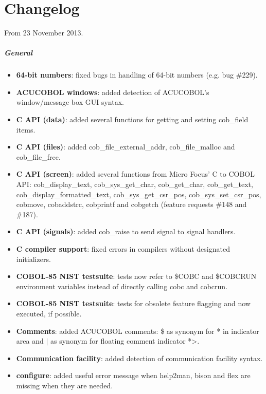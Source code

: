 \chapter{Changelog}

From 23 November 2013.


\paragraph{General}
\begin{itemize}
\item \textbf{64-bit numbers}: fixed bugs in handling of 64-bit numbers (e.g. bug \#229).
\item \textbf{ACUCOBOL windows}: added detection of ACUCOBOL's window\slash{}message box GUI syntax.
\item \textbf{C API (data)}: added several functions for getting and setting cob\_field items.
\item \textbf{C API (files)}: added cob\_file\_external\_addr, cob\_file\_malloc and cob\_file\_free.
\item \textbf{C API (screen)}: added several functions from Micro Focus' C to COBOL API: cob\_display\_text, cob\_sys\_get\_char, cob\_get\_char, cob\_get\_text, cob\_display\_formatted\_text, cob\_sys\_get\_csr\_pos, cob\_sys\_set\_csr\_pos, cobmove, cobaddstrc, cobprintf and cobgetch (feature requests \#148 and \#187).
\item \textbf{C API (signals)}: added cob\_raise to send signal to signal handlers.
\item \textbf{C compiler support}: fixed errors in compilers without designated initializers.
\item \textbf{COBOL-85 NIST testsuite}: tests now refer to \$COBC and \$COBCRUN environment variables instead of directly calling cobc and cobcrun.
\item \textbf{COBOL-85 NIST testsuite}: tests for obsolete feature flagging and now executed, if possible.
\item \textbf{Comments}: added ACUCOBOL comments: \$ as synonym for * in indicator area and $\vert$ as synonym for floating comment indicator *>.
\item \textbf{Communication facility}: added detection of communication facility syntax.
\item \textbf{configure}: added useful error message when help2man, bison and flex are missing when they are needed.

\end{itemize}
